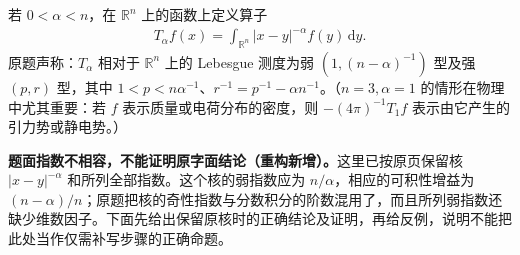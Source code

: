 \documentclass[../../main.tex]{subfiles}
\begin{document}
\begin{exercise}\label{exercise:ch06-riesz-kernel}
若 $0<\alpha<n$，在 $\mathbb R^n$ 上的函数上定义算子
\begin{align*}
T_\alpha f(x)=\int_{\mathbb R^n}|x-y|^{-\alpha}f(y)\,\mathrm dy.
\end{align*}
原题声称：$T_\alpha$ 相对于 $\mathbb R^n$ 上的 Lebesgue 测度为弱 $(1,(n-\alpha)^{-1})$ 型及强 $(p,r)$ 型，其中 $1<p<n\alpha^{-1}$、$r^{-1}=p^{-1}-\alpha n^{-1}$。（$n=3,\alpha=1$ 的情形在物理中尤其重要：若 $f$ 表示质量或电荷分布的密度，则 $-(4\pi)^{-1}T_1f$ 表示由它产生的引力势或静电势。）
\end{exercise}
\begin{remark}
\textbf{题面指数不相容，不能证明原字面结论（重构新增）。}这里已按原页保留核 $|x-y|^{-\alpha}$ 和所列全部指数。这个核的弱指数应为 $n/\alpha$，相应的可积性增益为 $(n-\alpha)/n$；原题把核的奇性指数与分数积分的阶数混用了，而且所列弱指数还缺少维数因子。下面先给出保留原核时的正确结论及证明，再给反例，说明不能把此处当作仅需补写步骤的正确命题。
\end{remark}
\end{document}
